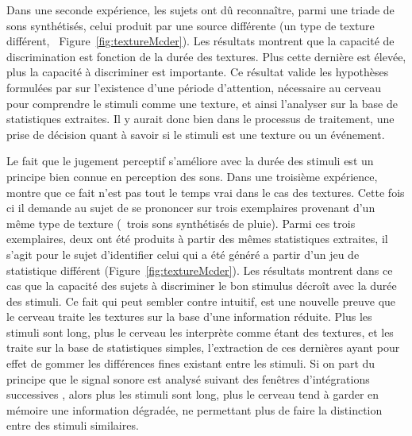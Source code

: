 Dans une seconde expérience, \citep{mcdermott2013summary} les sujets ont dû reconnaître, parmi une triade de sons synthétisés, celui produit par une source différente (\ie un type de texture différent, \Cf~Figure~\ref{fig:textureMcder}). Les résultats montrent que la capacité de discrimination est fonction de la durée des textures. Plus cette dernière est élevée, plus la capacité à discriminer est importante.  Ce résultat valide les hypothèses formulées par \citep{saint1995classification} sur l'existence d'une période d'attention, nécessaire au cerveau pour comprendre le stimuli comme une texture, et ainsi l'analyser sur la base de statistiques extraites. Il y aurait donc bien dans le processus de traitement, une prise de décision quant à savoir si le stimuli est une texture ou un événement.

Le fait que le jugement perceptif s'améliore avec la durée des stimuli est un principe bien connue en perception des sons\citep{moore1973frequency}. Dans une troisième expérience, \citep{mcdermott2013summary} montre que ce fait n'est pas tout le temps vrai dans le cas des textures. Cette fois ci il demande au sujet de se prononcer sur trois exemplaires provenant d'un même type de texture (\eg~trois sons synthétisés de pluie). Parmi ces trois exemplaires, deux ont été produits à partir des mêmes statistiques extraites, il s'agit pour le sujet d'identifier celui qui a été généré a partir d'un jeu de statistique différent (Figure~\ref{fig:textureMcder}). Les résultats montrent dans ce cas que la capacité des sujets à discriminer le bon stimulus décroît avec la durée des stimuli. Ce fait qui peut sembler contre intuitif, est une nouvelle preuve que le cerveau traite les textures sur la base d'une information réduite. Plus les stimuli sont long, plus le cerveau les interprète comme étant des textures, et les traite sur la base de statistiques simples,  l'extraction de ces dernières ayant pour effet de gommer les différences fines existant entre les stimuli. Si on part du principe que le signal sonore est analysé suivant des fenêtres d'intégrations successives \citep{yabe1998temporal,poeppel2003analysis}, alors plus les stimuli sont long, plus le cerveau tend à garder en mémoire une information dégradée, ne permettant plus de faire la distinction entre des stimuli similaires.

